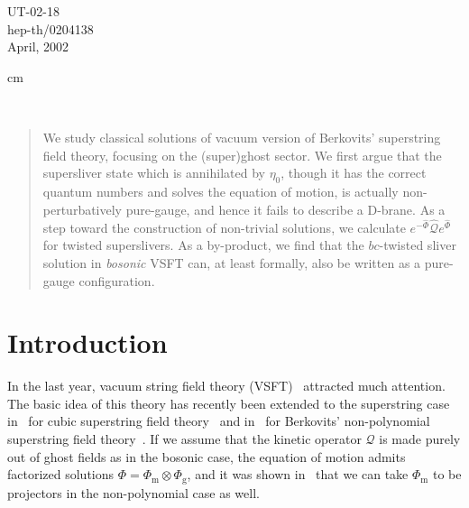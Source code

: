 \documentclass[a4paper,12pt]{article}
\newcommand{\cQ}{\mathcal{Q}}
\newcommand{\sectiono}[1]{\section{#1}\setcounter{equation}{0}}
\begin{document}
\begin{titlepage}
\thispagestyle{empty}
\begin{flushright}
UT-02-18 \\
hep-th/0204138 \\
April, 2002 
\end{flushright}

 cm

\begin{center}
\vskip 1.5cm
\\ 
\vspace{1cm}
\end{center}
\vspace{1cm}
\begin{abstract}
We study classical solutions of vacuum version of Berkovits' superstring field theory, focusing on 
the (super)ghost sector. We first argue that the supersliver state which is annihilated 
by $\eta_0$, though it has the correct quantum numbers and solves the equation of motion, 
is actually non-perturbatively pure-gauge, and hence it fails to describe a D-brane. 
As a step toward the construction of non-trivial solutions, we calculate 
$e^{-\widehat{\Phi}}\widehat{\cQ}e^{\widehat{\Phi}}$ for twisted superslivers. 
As a by-product, we find that the $bc$-twisted sliver solution 
in \textit{bosonic} VSFT can, at least formally, also be written as a pure-gauge configuration. 
\end{abstract}
\end{titlepage}
\newpage
\baselineskip 6mm


\sectiono{Introduction}
In the last year, vacuum string field theory (VSFT)~\cite{RSZ1,VSFT,GRSZ1} attracted much attention. 
The basic idea of this theory has recently been extended to the superstring case 
in~\cite{NSms,ABG,NSgs} for cubic superstring field theory~\cite{CSSFT,ABGKM} and in~\cite{MS} 
for Berkovits' non-polynomial superstring field theory~\cite{SSFT,Brev}. If we assume that the kinetic 
operator $\cQ$ is made purely out of ghost fields as in the bosonic case, the equation of motion admits 
factorized solutions $\Phi=\Phi_{\mathrm{m}}\otimes\Phi_{\mathrm{g}}$, and it was shown in~\cite{MS} 
that we can take $\Phi_{\mathrm{m}}$ to be projectors in the non-polynomial case as well. 
\end{document}
